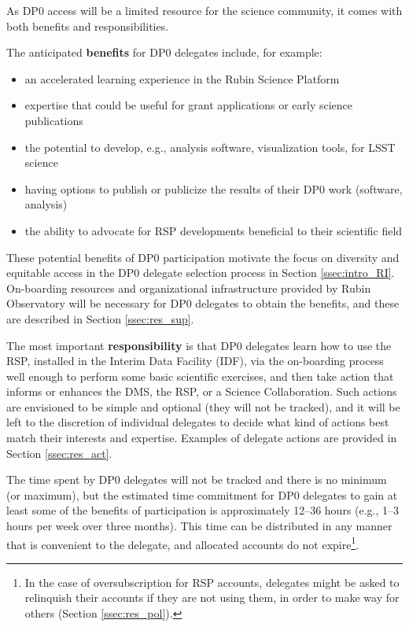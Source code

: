 \documentclass[DM,lsstdraft,authoryear,toc]{lsstdoc}
\begin{document}
As DP0 access will be a limited resource for the science community, it comes with both benefits and responsibilities.

The anticipated {\bf benefits} for DP0 delegates include, for example:
\begin{itemize}
\item an accelerated learning experience in the Rubin Science Platform
\item expertise that could be useful for grant applications or early science publications
\item the potential to develop, e.g., analysis software, visualization tools, for LSST science 
\item having options to publish or publicize the results of their DP0 work (software, analysis)
\item the ability to advocate for RSP developments beneficial to their scientific field
\end{itemize}

These potential benefits of DP0 participation motivate the focus on diversity and equitable access in the DP0 delegate selection process in Section \ref{ssec:intro_RI}.
On-boarding resources and organizational infrastructure provided by Rubin Observatory will be necessary for DP0 delegates to obtain the benefits, and these are described in Section \ref{ssec:res_sup}.

The most important {\bf responsibility} is that DP0 delegates learn how to use the RSP, installed in the Interim Data Facility (IDF), via the on-boarding process well enough to perform some basic scientific exercises, and then take action that informs or enhances the DMS, the RSP, or a Science Collaboration. 
Such actions are envisioned to be simple and optional (they will not be tracked), and it will be left to the discretion of individual delegates to decide what kind of actions best match their interests and expertise.
Examples of delegate actions are provided in Section \ref{ssec:res_act}.

The time spent by DP0 delegates will not be tracked and there is no minimum (or maximum), but the estimated time commitment for DP0 delegates to gain at least some of the benefits of participation is approximately 12--36 hours (e.g., 1--3 hours per week over three months).
This time can be distributed in any manner that is convenient to the delegate, and allocated accounts do not expire\footnote{In the case of oversubscription for RSP accounts, delegates might be asked to relinquish their accounts if they are not using them, in order to make way for others (Section \ref{ssec:res_pol}).}.
\end{document}
